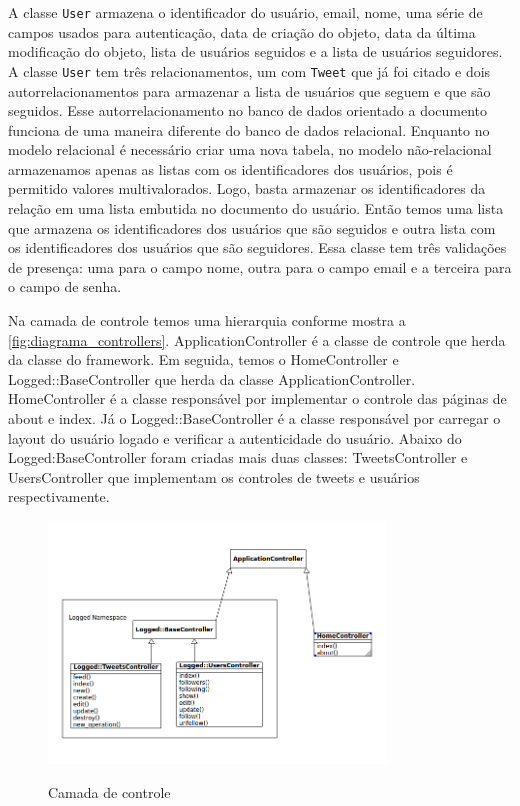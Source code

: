 A classe \verb|User| armazena o identificador do usuário, email, nome, uma série de campos usados para autenticação, data de criação do objeto, data da última modificação do objeto, lista de usuários seguidos e a lista de usuários seguidores. A classe \verb|User| tem três relacionamentos, um com \verb|Tweet| que já foi citado e dois autorrelacionamentos para armazenar a lista de usuários que seguem e que são seguidos. Esse autorrelacionamento no banco de dados orientado a documento funciona de uma maneira diferente do banco de dados relacional.
Enquanto no modelo relacional é necessário criar uma nova tabela, no modelo não-relacional armazenamos apenas as listas com os identificadores dos usuários, pois é permitido valores multivalorados. Logo, basta armazenar os identificadores da relação em uma lista embutida no documento do usuário. Então temos uma lista que armazena os identificadores dos usuários que são seguidos e outra lista com os identificadores dos usuários que são seguidores.
Essa classe tem três validações de presença: uma para o campo nome, outra para o campo email e a terceira para o campo de senha.

Na camada de controle temos uma hierarquia conforme mostra a \autoref{fig:diagrama_controllers}. ApplicationController é a classe de controle que herda da classe do framework. Em seguida, temos o HomeController e Logged::BaseController que herda  da classe ApplicationController. HomeController é a classe responsável por implementar o controle das páginas de about e index. Já o Logged::BaseController é a classe responsável por carregar o layout do usuário logado e verificar a autenticidade do usuário.
Abaixo do Logged:BaseController foram criadas mais duas classes: TweetsController e UsersController que implementam os controles de tweets e usuários respectivamente.
\begin{figure}[H]
    \centering
    \caption{Camada de controle}
    \includegraphics[width=0.8\textwidth]{./04-figuras/controllers_complete.png}
    \label{fig:diagrama_controllers}
\end{figure}

